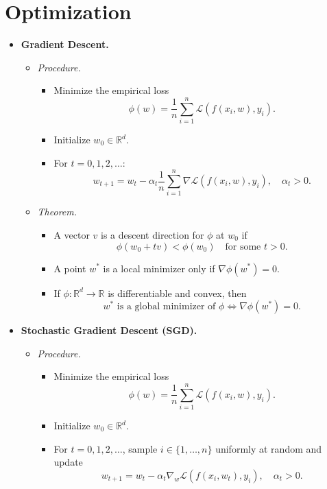 \documentclass[a4paper]{article}
\begin{document}
\section{Optimization}
\begin{itemize}
    \item \textbf{Gradient Descent.}  
        \begin{itemize}
            \item \textit{Procedure.}
                \begin{itemize}
                    \item Minimize the empirical loss  
                    \[
                        \phi(w) = \frac{1}{n} \sum_{i=1}^n \mathcal{L}(f(x_i, w), y_i).
                    \]
                    \item Initialize $w_0 \in \mathbb{R}^d$.
                    \item For $t = 0, 1, 2, \dots$:  
                    \[
                        w_{t+1} = w_t - \alpha_t \frac{1}{n} \sum_{i=1}^n \nabla \mathcal{L}(f(x_i, w), y_i), \quad \alpha_t > 0.
                    \]
                \end{itemize}

            \item \textit{Theorem.}
                \begin{itemize}
                    \item A vector $v$ is a descent direction for $\phi$ at $w_0$ if  
                    \[
                        \phi(w_0 + t v) < \phi(w_0) \quad \text{for some } t > 0.
                    \]  
                    \item A point $w^\ast$ is a local minimizer only if $\nabla \phi(w^\ast) = 0$.  
                    \item If $\phi : \mathbb{R}^d \to \mathbb{R}$ is differentiable and convex, then  
                    \[
                        w^\ast \text{ is a global minimizer of } \phi \iff \nabla \phi(w^\ast) = 0.
                    \]
                \end{itemize}
        \end{itemize}
    \item \textbf{Stochastic Gradient Descent (SGD).}  
        \begin{itemize}
            \item \textit{Procedure.}
                \begin{itemize}
                    \item Minimize the empirical loss  
                    \[
                        \phi(w) = \frac{1}{n} \sum_{i=1}^n \mathcal{L}(f(x_i, w), y_i).
                    \]
                    \item Initialize $w_0 \in \mathbb{R}^d$.
                    \item For $t = 0, 1, 2, \dots$, sample $i \in \{1,\dots,n\}$ uniformly at random and update  
                    \[
                        w_{t+1} = w_t - \alpha_t \nabla_w \mathcal{L}(f(x_i, w_t), y_i), 
                        \quad \alpha_t > 0.
                    \]
                \end{itemize}


\end{itemize}
\end{itemize}
\end{document}
